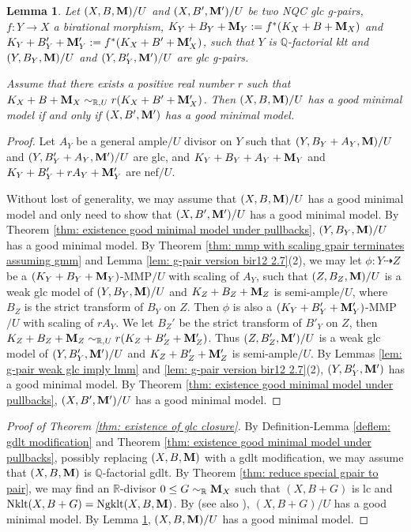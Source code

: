 \documentclass[11pt]{amsart}
\numberwithin{equation}{section}
\newcommand{\Mm}{{\bf{M}}}
\newcommand{\Qq}{\mathbb{Q}}
\newcommand{\Rr}{\mathbb{R}}
\newcommand{\Nklt}{\operatorname{Nklt}}
\newcommand{\Ngklt}{\operatorname{Ngklt}}
\newtheorem{lem}[thm]{Lemma}
\theoremstyle{definition}
\theoremstyle{definition}
\theoremstyle{definition}
\begin{document}
\begin{lem}\label{lem: rlin equivalent good minimal model}
Let $(X,B,\Mm)/U$ and $(X,B',\Mm')/U$ be two NQC glc g-pairs, $f: Y\rightarrow X$ a birational morphism, $K_Y+B_Y+\Mm_Y:=f^*(K_X+B+\Mm_X)$ and $K_Y+B_Y'+\Mm'_Y:=f^*(K_X+B'+\Mm'_X)$, such that $Y$ is $\Qq$-factorial klt and $(Y,B_Y,\Mm)/U$ and $(Y,B_Y',\Mm')/U$ are glc g-pairs. 


Assume that there exists a positive real number $r$ such that $K_X+B+\Mm_X\sim_{\Rr,U}r(K_X+B'+\Mm'_X)$. Then $(X,B,\Mm)/U$ has a good minimal model if and only if $(X,B',\Mm')$ has a good minimal model.
\end{lem}
\begin{proof}
Let $A_Y$ be a general ample$/U$ divisor on $Y$ such that $(Y,B_Y+A_Y,\Mm)/U$ and $(Y,B'_Y+A_Y,\Mm')/U$ are glc, and $K_Y+B_Y+A_Y+\Mm_Y$ and $K_Y+B'_Y+rA_Y+\Mm'_Y$ are nef$/U$.

Without lost of generality, we may assume that $(X,B,\Mm)/U$ has a good minimal model and only need to show that $(X,B',\Mm')/U$ has a good minimal model. By Theorem \ref{thm: existence good minimal model under pullbacks}, $(Y,B_Y,\Mm)/U$ has a good minimal model. By Theorem \ref{thm: mmp with scaling gpair terminates assuming gmm} and Lemma \ref{lem: g-pair version bir12 2.7}(2), we may let $\phi: Y\dashrightarrow Z$ be a $(K_Y+B_Y+\Mm_Y)$-MMP$/U$ with scaling of $A_Y$, such that $(Z,B_Z,\Mm)/U$ is a weak glc model of $(Y,B_Y,\Mm)/U$ and $K_Z+B_Z+\Mm_Z$ is semi-ample$/U$, where $B_Z$ is the strict transform of $B_Y$ on $Z$. Then $\phi$ is also a $(K_Y+B'_Y+\Mm'_Y)$-MMP$/U$ with scaling of $rA_Y$. We let $B_Z'$ be the strict transform of $B'_Y$ on $Z$, then $K_Z+B_Z+\Mm_Z\sim_{\Rr,U}r(K_Z+B'_Z+\Mm'_Z)$. Thus $(Z,B'_Z,\Mm')/U$ is a weak glc model of $(Y,B_Y',\Mm')/U$ and $K_Z+B'_Z+\Mm'_Z$ is semi-ample$/U$. By Lemmas \ref{lem: g-pair weak glc imply lmm} and \ref{lem: g-pair version bir12 2.7}(2), $(Y,B_Y',\Mm')$ has a good minimal model. By Theorem \ref{thm: existence good minimal model under pullbacks}, $(X,B',\Mm')/U$ has a good minimal model.
\end{proof}

\begin{proof}[Proof of Theorem \ref{thm: existence of glc closure}]
By Definition-Lemma \ref{deflem: gdlt modification} and Theorem \ref{thm: existence good minimal model under pullbacks}, possibly replacing $(X,B,\Mm)$ with a gdlt modification, we may assume that $(X,B,\Mm)$ is $\Qq$-factorial gdlt. By Theorem \ref{thm: reduce special gpair to pair}, we may find an $\Rr$-divisor $0\leq G\sim_{\mathbb R}\Mm_X$ such that $(X,B+G)$ is lc and $\Nklt(X,B+G)=\Ngklt(X,B,\Mm)$. By \cite[Theorem 1.2]{Has19} (see also \cite[Theorem 1.1]{HX13}), $(X,B+G)/U$ has a good minimal model. By Lemma \ref{lem: rlin equivalent good minimal model}, $(X,B,\Mm)/U$ has a good minimal model.
\end{proof}
\end{document}
